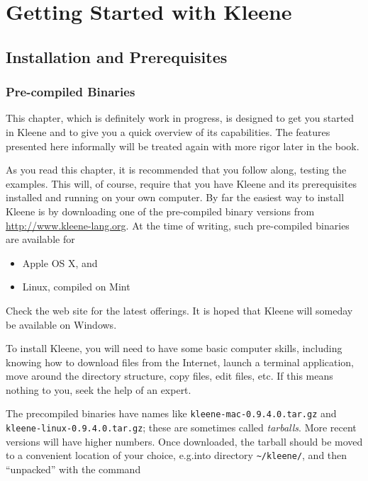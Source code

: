 \chapter{Getting Started with Kleene}

\section{Installation and Prerequisites}

\subsection{Pre-compiled Binaries}

This chapter, which is definitely work in progress, is designed to get
you started in Kleene and to give you a quick overview of its capabilities.
The features presented here informally will be treated again with 
more rigor later in the book.

As you read this chapter, it is recommended that you follow along, testing
the examples.  This will, of course, require that you have Kleene and its
prerequisites installed and running on your own computer.  By far the
easiest way to install Kleene is by downloading one of the pre-compiled
binary versions from \url{http://www.kleene-lang.org}.  At the time of
writing, such pre-compiled binaries are available for

\begin{itemize}
\item
Apple OS X, and
\item
Linux, compiled on Mint
\end{itemize}

\noindent
Check the web site for the latest offerings.  
It is hoped that Kleene will someday be available on Windows.

To install Kleene, you will need to have some basic computer skills, including knowing how
to
download files from the Internet,
launch a terminal application, move around the directory structure,
copy files, edit files, etc.  If this means nothing to you, seek the
help of an expert.

The precompiled binaries have names like \texttt{kleene-mac-0.9.4.0.tar.gz} and
\texttt{kleene-linux-0.9.4.0.tar.gz}; these are sometimes called \emph{tarballs}.  More recent
versions will have higher numbers.  Once downloaded, the tarball should be moved
to a convenient location of your choice, e.g.\@ into directory 
\texttt{\~{}/kleene/}, and then
``unpacked'' with the command


